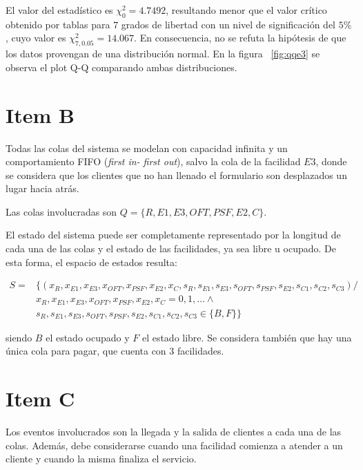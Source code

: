 \documentclass[a4paper,10pt]{article}
\begin{document}
El valor del estad\'istico es $\chi_0^2 = 4.7492$, resultando menor que el valor 
cr\'itico obtenido por tablas para $7$ grados de libertad con un nivel de 
significaci\'on del $5\%$, cuyo valor es $\chi_{7,0.05}^2 = 14.067$. En
consecuencia, no se refuta la hip\'otesis de que los datos provengan de una 
distribuci\'on normal. En la figura  ~\ref{fig:qqe3} se observa el plot Q-Q comparando
ambas distribuciones.


\section*{Item B}

Todas las colas del sistema se modelan con capacidad infinita y un
comportamiento FIFO (\textit{first in- first out}), salvo la cola de la
facilidad $E3$, donde se considera que los clientes que no han llenado el
formulario son desplazados un lugar hacia atr\'as.


Las colas involucradas son $Q = \{R, E1, E3, OFT, PSF, E2, C\}$.


El estado del sistema puede ser completamente representado por la longitud
de cada una de las colas y el estado de las facilidades, ya sea
libre u ocupado. De esta forma, el espacio de estados resulta:

\begin{equation*}
\begin{split}
S = & \{(x_{R}, x_{E1}, x_{E3}, x_{OFT}, x_{PSF}, x_{E2}, x_{C}, s_{R},
s_{E1}, s_{E3}, s_{OFT}, s_{PSF}, s_{E2}, s_{C1}, s_{C2}, s_{C3}) / \\
& 
 x_{R}, x_{E1}, x_{E3}, x_{OFT}, x_{PSF}, x_{E2}, x_{C} = 0, 1, \dots \wedge \\
&
 s_{R},
s_{E1}, s_{E3}, s_{OFT}, s_{PSF}, s_{E2}, s_{C1}, s_{C2}, s_{C3} \in \{B, F\}\}
\end{split}
\end{equation*}

siendo $B$ el estado ocupado y $F$ el estado libre. 
Se considera tambi\'en que hay una \'unica cola para pagar, que cuenta con 3 
facilidades.

\section*{Item C}

Los eventos involucrados son la llegada y la salida de clientes a cada una 
de las colas. Adem\'as, debe considerarse cuando una facilidad comienza a 
atender a un cliente y cuando la misma finaliza el servicio.
\end{document}
